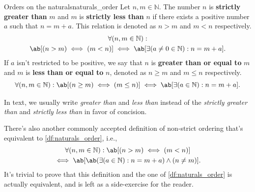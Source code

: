 \begin{df}{Orders on the naturals}{naturals_order}
  Let \(n, m \in \mathbb{N}\). The number \(n\) is \textbf{strictly greater than} \(m\) and \(m\) is
  \textbf{strictly less than} \(n\) if there exists a positive number \(a\) such that \(n = m + a\).
  This relation is denoted as \(n > m\) and \(m < n\) respectively.
  \begin{multline*}
    \forall (n, m \in \mathbb{N}) :                                                        \\
    \ab[ (n > m) \iff (m < n) ] \iff \ab[ \exists (a \neq 0 \in \mathbb{N}) : n = m + a ].
  \end{multline*}
  If \(a\) isn't restricted to be positive, we say that \(n\) is \textbf{greater than or equal to}
  \(m\) and \(m\) is \textbf{less than or equal to} \(n\), denoted as \(n \geq m\) and \(m \leq n\)
  respectively.
  \begin{equation*}
    \forall (n, m \in \mathbb{N}) : \ab[ (n \geq m) \iff (m \leq n) ] \iff \ab[ \exists (a \in \mathbb{N}) : n = m + a ].
  \end{equation*}
\end{df}

In text, we usually write \emph{greater than} and \emph{less than} instead of the \emph{strictly
greater than} and \emph{strictly less than} in favor of concision.

There's also another commonly accepted definition of non-strict ordering that's equivalent to
\cref{df:naturals_order}, i.e.,
\begin{multline*}
  \forall (n, m \in \mathbb{N}) : \ab[ (n > m) \iff (m < n) ]              \\
  \iff \ab[ \ab(\exists (a \in \mathbb{N}) : n = m + a) \land (n \neq m)].
\end{multline*}
It's trivial to prove that this definition and the one of \cref{df:naturals_order} is actually
equivalent, and is left as a side-exercise for the reader.

